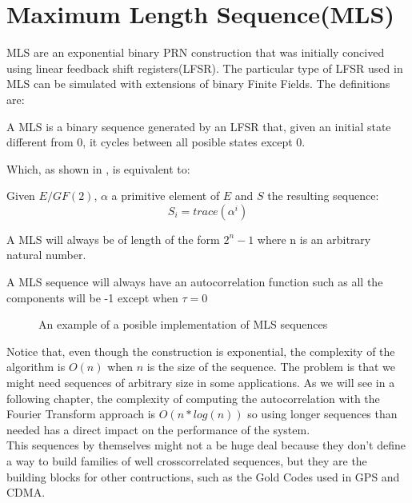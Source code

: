 \section{Maximum Length Sequence(MLS)}

MLS are an exponential binary PRN construction that was initially concived
using linear feedback shift registers(LFSR). The particular type of LFSR used
in MLS can be simulated with extensions of binary Finite Fields. The
definitions are:

\begin{definition}[LFSR]
  A MLS is a binary sequence generated by an LFSR that, given an initial state
  different from 0, it cycles between all posible states except 0.
\end{definition}

Which, as shown in \citet{golomb_ref}, is equivalent to:

\begin{definition}
  Given $E/GF(2)$, $\alpha$ a primitive element of $E$ and $S$ the resulting
  sequence:
  \begin{equation}
    S_{i} = trace(\alpha^{i})
  \end{equation}
\end{definition}

\begin{property}
  A MLS will always be of length of the form $2^{n}-1$ where n is an arbitrary
  natural number.
\end{property}

\begin{property}
  A MLS sequence will always have an autocorrelation function such as all the
  components will be -1 except when $\tau = 0$
\end{property}

\begin{figure}[ht!]
  \caption{An example of a posible implementation of MLS sequences}
  \label{mls:fig:1}
\end{figure}

Notice that, even though the construction is exponential, the complexity of
the algorithm is $O(n)$ when $n$ is the size of the sequence. The problem is
that we might need sequences of arbitrary size in some applications. As we will
see in a following chapter, the complexity of computing the autocorrelation
with the Fourier Transform approach is $O(n*log(n))$ so using longer sequences
than needed has a direct impact on the performance of the system. \\

This sequences by themselves might not a be huge deal because they don't define
a way to build families of well crosscorrelated sequences, but they are the
building blocks for other contructions, such as the Gold Codes used in GPS and
CDMA.
